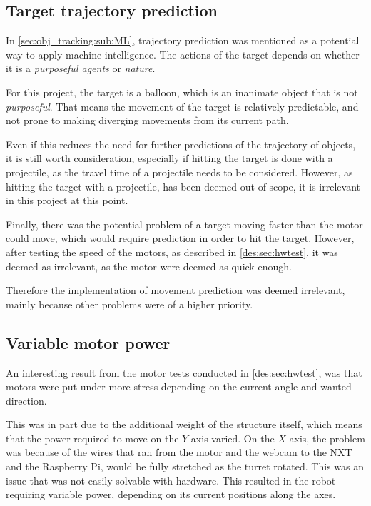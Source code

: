 \subsection{Target trajectory prediction}
In \autoref{sec:obj_tracking:sub:ML}, trajectory prediction was mentioned as a potential way to apply machine intelligence.
The actions of the target depends on whether it is a \textit{purposeful agents} or \textit{nature}.

For this project, the target is a balloon, which is an inanimate object that is not \textit{purposeful}.
That means the movement of the target is relatively predictable, and not prone to making diverging movements from its current path.

Even if this reduces the need for further predictions of the trajectory of objects, it is still worth consideration, especially if hitting the target is done with a projectile, as the travel time of a projectile needs to be considered.
However, as hitting the target with a projectile, has been deemed out of scope, it is irrelevant in this project at this point.

Finally, there was the potential problem of a target moving faster than the motor could move, which would require prediction in order to hit the target.
However, after testing the speed of the motors, as described in \autoref{des:sec:hwtest}, it was deemed as irrelevant, as the motor were deemed as quick enough.

Therefore the implementation of movement prediction was deemed irrelevant, mainly because other problems were of a higher priority.

\subsection{Variable motor power}
An interesting result from the motor tests conducted in \autoref{des:sec:hwtest}, was that motors were put under more stress depending on the current angle and wanted direction.

This was in part due to the additional weight of the structure itself, which means that the power required to move on the $Y$-axis varied.
On the $X$-axis, the problem was because of the wires that ran from the motor and the webcam to the NXT and the Raspberry Pi, would be fully stretched as the turret rotated.
This was an issue that was not easily solvable with hardware.
This resulted in the robot requiring variable power, depending on its current positions along the axes.

